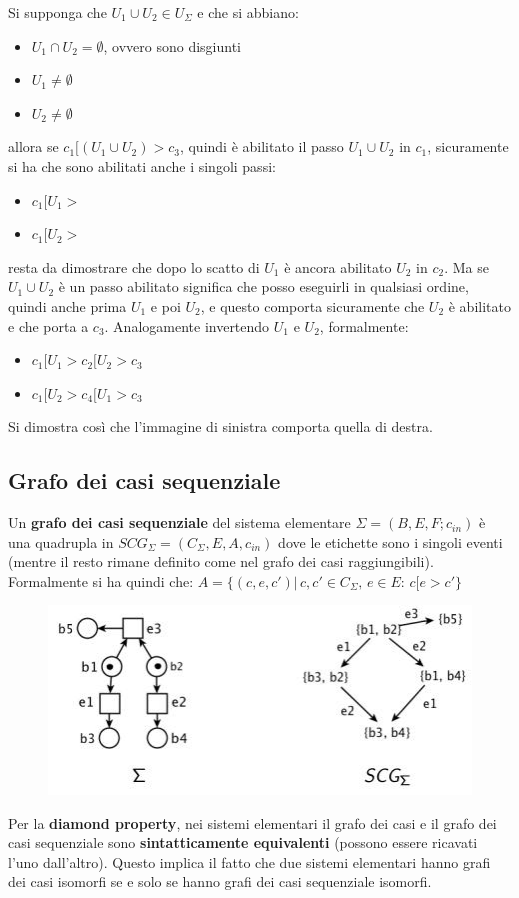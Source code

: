 \begin{enumerate}
\begin{figure}[H]
  \end{figure}
  Si supponga che $U_1\cup U_2\in U_\Sigma$ e che si abbiano:
  \begin{itemize}
    \item $U_1\cap U_2=\emptyset$, ovvero sono disgiunti
    \item $U_1\neq\emptyset$
    \item $U_2\neq\emptyset$
  \end{itemize}
  allora se $c_1[(U_1\cup U_2)>c_3$, quindi è abilitato il passo $U_1\cup U_2$ in $c_1$, sicuramente si ha che sono abilitati anche i singoli passi:
  \begin{itemize}
    \item $c_1[U_1>$
    \item $c_1[U_2>$
  \end{itemize}
resta da dimostrare che dopo lo scatto di $U_1$ è ancora abilitato $U_2$ in $c_2$. Ma se $U_1\cup U_2$ è un passo abilitato significa che posso eseguirli in qualsiasi ordine, quindi anche prima $U_1$ e poi $U_2$, e questo comporta sicuramente che $U_2$ è abilitato e che porta a $c_3$. Analogamente invertendo $U_1$ e $U_2$, formalmente:
  \begin{itemize}
    \item $c_1[U_1>c_2[U_2>c_3$
    \item $c_1[U_2>c_4[U_1>c_3$
  \end{itemize}
  Si dimostra così che l'immagine di sinistra comporta quella di destra.
\end{enumerate}

\subsection{Grafo dei casi sequenziale}
Un \textbf{grafo dei casi sequenziale} del sistema elementare $\Sigma=(B,E,F;c_{in})$ è una quadrupla in $SCG_\Sigma=(C_\Sigma,E,A,c_{in})$ dove le etichette sono i singoli eventi (mentre il resto rimane definito come nel grafo dei casi raggiungibili). Formalmente si ha quindi che:
$A=\{(c,e,c')|\,c,c'\in C_\Sigma,\,e\in E:\, c[e>c'\}$
\begin{figure}[H]
    \centering
    \includegraphics[scale = 0.6]{IMM/seq3.jpg}
\end{figure}
Per la \textbf{diamond property}, nei sistemi elementari il grafo dei casi e il grafo dei casi sequenziale sono \textbf{sintatticamente equivalenti} (possono essere ricavati l’uno dall’altro). Questo implica il fatto che due sistemi elementari hanno grafi dei casi isomorfi se e solo se hanno grafi dei casi sequenziale isomorfi.

